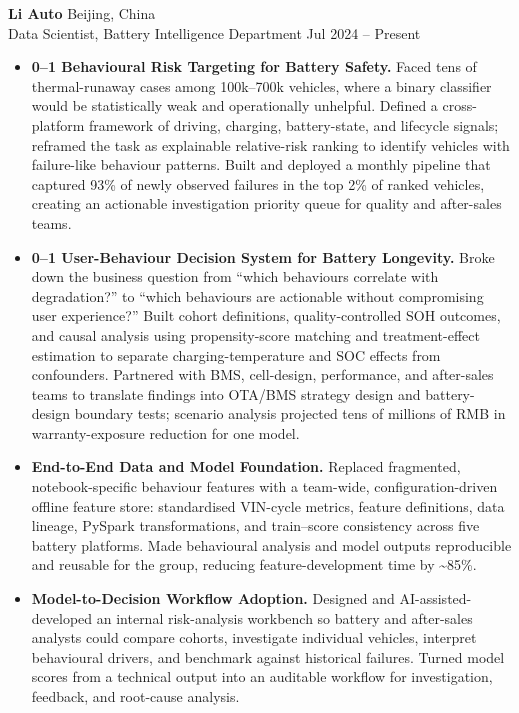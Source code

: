\documentclass[a4paper,10pt]{article}
\begin{document}
\noindent\textbf{Li Auto} \hfill Beijing, China\\
Data Scientist, Battery Intelligence Department \hfill Jul 2024 -- Present
\begin{itemize}
    \item \textbf{0--1 Behavioural Risk Targeting for Battery Safety.} Faced tens of thermal-runaway cases among 100k--700k vehicles, where a binary classifier would be statistically weak and operationally unhelpful. Defined a cross-platform framework of driving, charging, battery-state, and lifecycle signals; reframed the task as explainable relative-risk ranking to identify vehicles with failure-like behaviour patterns. Built and deployed a monthly pipeline that captured 93\% of newly observed failures in the top 2\% of ranked vehicles, creating an actionable investigation priority queue for quality and after-sales teams.

    \item \textbf{0--1 User-Behaviour Decision System for Battery Longevity.} Broke down the business question from ``which behaviours correlate with degradation?'' to ``which behaviours are actionable without compromising user experience?'' Built cohort definitions, quality-controlled SOH outcomes, and causal analysis using propensity-score matching and treatment-effect estimation to separate charging-temperature and SOC effects from confounders. Partnered with BMS, cell-design, performance, and after-sales teams to translate findings into OTA/BMS strategy design and battery-design boundary tests; scenario analysis projected tens of millions of RMB in warranty-exposure reduction for one model.

    \item \textbf{End-to-End Data and Model Foundation.} Replaced fragmented, notebook-specific behaviour features with a team-wide, configuration-driven offline feature store: standardised VIN-cycle metrics, feature definitions, data lineage, PySpark transformations, and train--score consistency across five battery platforms. Made behavioural analysis and model outputs reproducible and reusable for the group, reducing feature-development time by \textasciitilde85\%.

    \item \textbf{Model-to-Decision Workflow Adoption.} Designed and AI-assisted-developed an internal risk-analysis workbench so battery and after-sales analysts could compare cohorts, investigate individual vehicles, interpret behavioural drivers, and benchmark against historical failures. Turned model scores from a technical output into an auditable workflow for investigation, feedback, and root-cause analysis.
\end{itemize}
\end{document}
